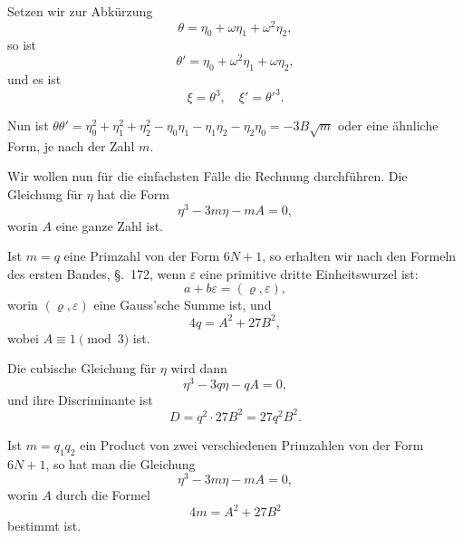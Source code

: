 \documentclass[12pt,a4paper]{article}
\theoremstyle{plain}
\theoremstyle{definition}
\theoremstyle{remark}
\begin{document}
Setzen wir zur Abkürzung
\begin{equation}\tag{6}
\theta = \eta_0 + \omega \eta_1 + \omega^2 \eta_2,
\end{equation}
so ist
\begin{equation}\tag{7}
\theta' = \eta_0 + \omega^2 \eta_1 + \omega \eta_2,
\end{equation}
und es ist
\begin{equation}\tag{8}
\xi = \theta^3, \quad \xi' = \theta'^3.
\end{equation}

Nun ist $\theta \theta' = \eta_0^2 + \eta_1^2 + \eta_2^2 - \eta_0\eta_1 - \eta_1\eta_2 - \eta_2\eta_0 = -3B\sqrt{m}$ oder eine ähnliche Form, je nach der Zahl $m$.

Wir wollen nun für die einfachsten Fälle die Rechnung durchführen. Die Gleichung für $\eta$ hat die Form
\begin{equation}\tag{9}
\eta^3 - 3m\eta - mA = 0,
\end{equation}
worin $A$ eine ganze Zahl ist.

Ist $m = q$ eine Primzahl von der Form $6N+1$, so erhalten wir nach den Formeln des ersten Bandes, \S.~172, wenn $\varepsilon$ eine primitive dritte Einheitswurzel ist:
\begin{equation}\tag{10}
a + b\varepsilon = (\varrho, \varepsilon),
\end{equation}
worin $(\varrho, \varepsilon)$ eine Gauss'sche Summe ist, und
\begin{equation}\tag{11}
4q = A^2 + 27B^2,
\end{equation}
wobei $A \equiv 1 \pmod{3}$ ist.

Die cubische Gleichung für $\eta$ wird dann
\begin{equation}\tag{12}
\eta^3 - 3q\eta - qA = 0,
\end{equation}
und ihre Discriminante ist
\begin{equation}\tag{13}
D = q^2 \cdot 27B^2 = 27q^2B^2.
\end{equation}

Ist $m = q_1 q_2$ ein Product von zwei verschiedenen Primzahlen von der Form $6N+1$, so hat man die Gleichung
\begin{equation}\tag{14}
\eta^3 - 3m\eta - mA = 0,
\end{equation}
worin $A$ durch die Formel
\begin{equation}\tag{15}
4m = A^2 + 27B^2
\end{equation}
bestimmt ist.
\end{document}
